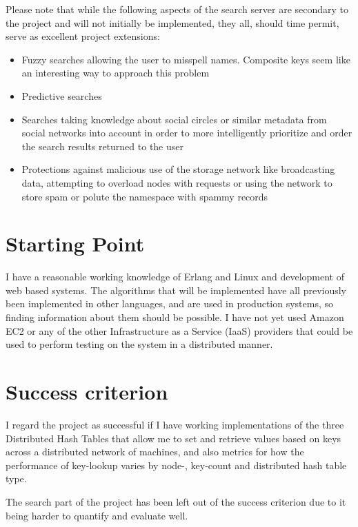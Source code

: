 Please note that while the following aspects of the search server are secondary to the project and will not initially be implemented, they all, should time permit, serve as excellent project extensions:

\begin{itemize}
  \item Fuzzy searches allowing the user to misspell names. Composite keys seem like an interesting way to approach this problem
  \item Predictive searches
  \item Searches taking knowledge about social circles or similar metadata from social networks into account in order to more intelligently prioritize and order the search results returned to the user
  \item Protections against malicious use of the storage network like broadcasting data, attempting to overload nodes with requests or using the network to store spam or polute the namespace with spammy records
\end{itemize}


\section*{Starting Point}

I have a reasonable working knowledge of Erlang and Linux and development of web based systems. The algorithms that will be implemented have all previously been implemented in other languages, and are used in production systems, so finding information about them should be possible. I have not yet used Amazon EC2 or any of the other Infrastructure as a Service (IaaS) providers that could be used to perform testing on the system in a distributed manner.


\section*{Success criterion}

I regard the project as successful if I have working implementations of the three Distributed Hash Tables that allow me to set and retrieve values based on keys across a distributed network of machines, and also metrics for how the performance of key-lookup varies by node-, key-count and distributed hash table type.

The search part of the project has been left out of the success criterion due to it being harder to quantify and evaluate well.

